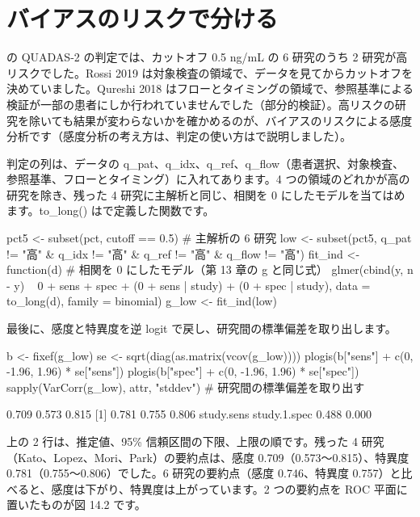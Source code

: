 \section{バイアスのリスクで分ける}
\label{sec:14-5}

の QUADAS-2 の判定では、カットオフ 0.5 ng/mL の 6 研究のうち 2 研究が高リスクでした。Rossi 2019 は対象検査の領域で、データを見てからカットオフを決めていました。Qureshi 2018 はフローとタイミングの領域で、参照基準による検証が一部の患者にしか行われていませんでした（部分的検証）。高リスクの研究を除いても結果が変わらないかを確かめるのが、バイアスのリスクによる感度分析です（感度分析の考え方は、判定の使い方はで説明しました）。

判定の列は、データの q\_pat、q\_idx、q\_ref、q\_flow（患者選択、対象検査、参照基準、フローとタイミング）に入れてあります。4 つの領域のどれかが高の研究を除き、残った 4 研究に主解析と同じ、相関を 0 にしたモデルを当てはめます。to\_long() はで定義した関数です。

\begin{rcode}
pct5 <- subset(pct, cutoff == 0.5)        # 主解析の 6 研究
low <- subset(pct5, q_pat != "高" & q_idx != "高" &
                    q_ref != "高" & q_flow != "高")
fit_ind <- function(d)                    # 相関を 0 にしたモデル（第 13 章の g と同じ式）
  glmer(cbind(y, n - y) ~ 0 + sens + spec +
          (0 + sens | study) + (0 + spec | study),
        data = to_long(d), family = binomial)
g_low <- fit_ind(low)
\end{rcode}

最後に、感度と特異度を逆 logit で戻し、研究間の標準偏差を取り出します。

\begin{rcode}
b <- fixef(g_low)
se <- sqrt(diag(as.matrix(vcov(g_low))))
plogis(b["sens"] + c(0, -1.96, 1.96) * se["sens"])
plogis(b["spec"] + c(0, -1.96, 1.96) * se["spec"])
sapply(VarCorr(g_low), attr, "stddev")   # 研究間の標準偏差を取り出す
\end{rcode}

\begin{rout}
[1] 0.709 0.573 0.815
[1] 0.781 0.755 0.806
  study.sens study.1.spec
       0.488        0.000
\end{rout}

上の 2 行は、推定値、95\% 信頼区間の下限、上限の順です。残った 4 研究（Kato、Lopez、Mori、Park）の要約点は、感度 0.709（0.573〜0.815）、特異度 0.781（0.755〜0.806）でした。6 研究の要約点（感度 0.746、特異度 0.757）と比べると、感度は下がり、特異度は上がっています。2 つの要約点を ROC 平面に置いたものが図 14.2 です。

